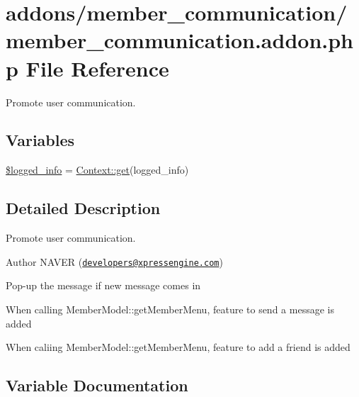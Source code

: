\hypertarget{member__communication_8addon_8php}{}\section{addons/member\+\_\+communication/member\+\_\+communication.addon.\+php File Reference}
\label{member__communication_8addon_8php}


Promote user communication.  


\subsection*{Variables}
\begin{DoxyCompactItemize}
\item 
\hyperlink{member__communication_8addon_8php_a193c1593ceb216e9fb05b0bad01ebbc8}{\$logged\+\_\+info} = \hyperlink{classContext_a90ce25d65fe6c9778421cbb36ab3def5}{Context\+::get}(\textquotesingle{}logged\+\_\+info\textquotesingle{})
\end{DoxyCompactItemize}


\subsection{Detailed Description}
Promote user communication. 

\begin{DoxyAuthor}{Author}
N\+A\+V\+ER (\href{mailto:developers@xpressengine.com}{\tt developers@xpressengine.\+com})
\begin{DoxyItemize}
\item Pop-\/up the message if new message comes in
\item When calling Member\+Model\+::get\+Member\+Menu, feature to send a message is added
\item When caliing Member\+Model\+::get\+Member\+Menu, feature to add a friend is added 
\end{DoxyItemize}
\end{DoxyAuthor}


\subsection{Variable Documentation}
\mbox{\label{member__communication_8addon_8php_a193c1593ceb216e9fb05b0bad01ebbc8}} 
